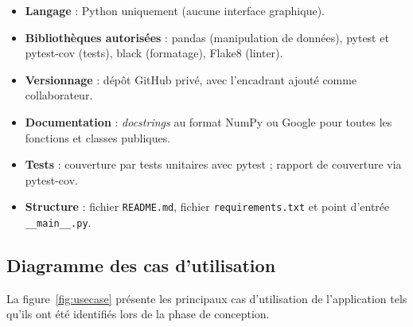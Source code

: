 \documentclass[12pt,a4paper]{article}
\newcommand{\fichier}[1]{\texttt{#1}}
\begin{document}
\begin{itemize}
  \item \textbf{Langage} : Python uniquement (aucune interface graphique).
  \item \textbf{Bibliothèques autorisées} : pandas (manipulation de données),
        pytest et pytest-cov (tests), black (formatage), Flake8 (linter).
  \item \textbf{Versionnage} : dépôt GitHub privé, avec l'encadrant ajouté
        comme collaborateur.
  \item \textbf{Documentation} : \textit{docstrings} au format NumPy ou Google
        pour toutes les fonctions et classes publiques.
  \item \textbf{Tests} : couverture par tests unitaires avec pytest ; rapport
        de couverture via pytest-cov.
  \item \textbf{Structure} : fichier \fichier{README.md}, fichier
        \fichier{requirements.txt} et point d'entrée \fichier{\_\_main\_\_.py}.
\end{itemize}

\subsection{Diagramme des cas d'utilisation}

La figure~\ref{fig:usecase} présente les principaux cas d'utilisation de
l'application tels qu'ils ont été identifiés lors de la phase de conception.
\end{document}
